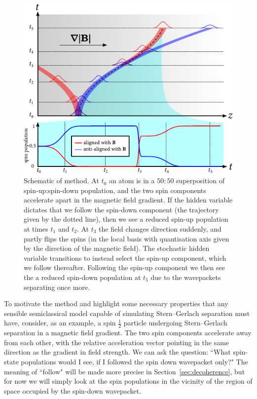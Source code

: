 \begin{figure}[t]
    \centerfloat
    \includegraphics{figures/hidden_variables/schematic.pdf}
    \caption{Schematic of method. At $t_0$ an atom is in a $50:50$ superposition of spin-up:spin-down population, and the two spin components accelerate apart in the magnetic field gradient. If the hidden variable dictates that we follow the spin-down component (the trajectory given by the dotted line), then we see a reduced spin-up population at times $t_1$ and $t_2$. At $t_3$ the field changes direction suddenly, and partly flips the spins (in the local basis with quantisation axis given by the direction of the magnetic field). The stochastic hidden variable transitions to instead select the spin-up component, which we follow thereafter. Following the spin-up component we then see the a reduced spin-down population at $t_5$ due to the wavepackets separating once more.}\label{fig:HVSC_schematic}
\end{figure}

To motivate the method and highlight some necessary properties that any sensible semiclassical model capable of simulating Stern--Gerlach separation must have, consider, as an example, a spin $\frac12$ particle undergoing Stern--Gerlach separation in a magnetic field gradient. The two spin components accelerate away from each other, with the relative acceleration vector pointing in the same direction as the gradient in field strength. We can ask the question: ``What spin-state populations would I see, if I followed the spin down wavepacket only?" The meaning of ``follow" will be made more precise in Section~\ref{sec:decoherence}, but for now we will simply look at the spin populations in the vicinity of the region of space occupied by the spin-down wavepacket.

